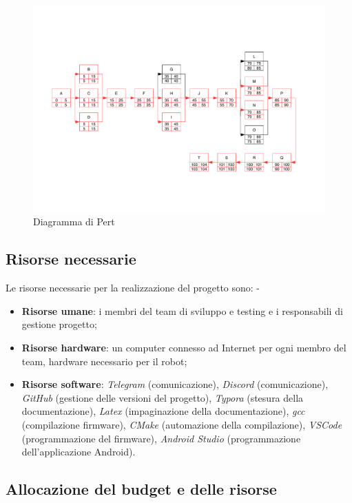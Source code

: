 \documentclass{article}
\begin{document}
  \begin{figure}[htbp]
  \centering
  \includegraphics[trim={0 4cm 0 4cm},clip,width=16cm]{PERT.pdf}
  \caption{Diagramma di Pert}
  \end{figure}
  
  
  \subsection{Risorse necessarie}
  
  Le risorse necessarie per la realizzazione del progetto sono: -
  
  \begin{itemize}
  \item \textbf{Risorse umane}: i membri del team di sviluppo e testing e i responsabili di gestione progetto;
  \item \textbf{Risorse hardware}: un computer connesso ad Internet per ogni membro del team, hardware necessario per il robot;
  \item \textbf{Risorse software}: \emph{Telegram} (comunicazione), \emph{Discord} (comunicazione), \emph{GitHub} (gestione delle versioni del progetto), \emph{Typora} (stesura della documentazione), \emph{Latex} (impaginazione della documentazione), \emph{gcc} (compilazione firmware), \emph{CMake} (automazione della compilazione), \emph{VSCode} (programmazione del firmware), \emph{Android Studio} (programmazione dell'applicazione Android).
  \end{itemize}
  
  \subsection{Allocazione del budget e delle
  risorse}
  
\end{document}
